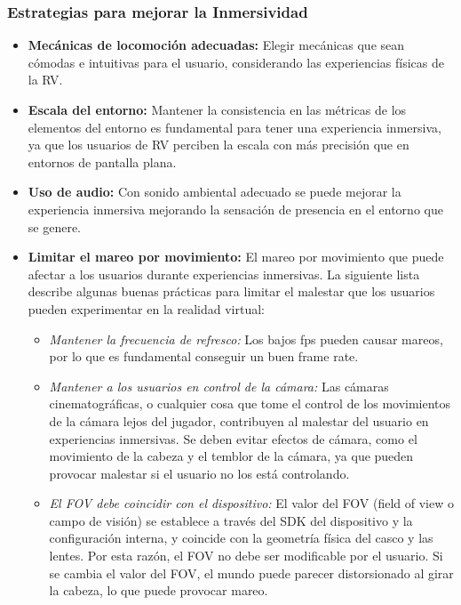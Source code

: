             \subsubsection{Estrategias para mejorar la Inmersividad}
            \begin{itemize}
                \item \textbf{Mecánicas de locomoción adecuadas:}  Elegir mecánicas que sean cómodas e intuitivas para el usuario, considerando las experiencias físicas de la RV. 
                \item \textbf{Escala del entorno:} Mantener la consistencia en las métricas de los elementos del entorno es fundamental para tener una experiencia inmersiva, ya que los usuarios de RV perciben la escala con más precisión que en entornos de pantalla plana.
                \item \textbf{Uso de audio:} Con sonido ambiental adecuado se puede mejorar la experiencia inmersiva mejorando la sensación de presencia en el entorno que se genere.
                \item \textbf{Limitar el mareo por movimiento:} El mareo por movimiento que puede afectar a los usuarios durante experiencias inmersivas. La siguiente lista describe algunas buenas prácticas para limitar el malestar que los usuarios pueden experimentar en la realidad virtual:
                \begin{itemize}
                    \item \textit{Mantener la frecuencia de refresco:} Los bajos fps pueden causar mareos, por lo que es fundamental conseguir un buen frame rate.

                    \item \textit{Mantener a los usuarios en control de la cámara:} Las cámaras cinematográficas, o cualquier cosa que tome el control de los movimientos de la cámara lejos del jugador, contribuyen al malestar del usuario en experiencias inmersivas. Se deben evitar efectos de cámara, como el movimiento de la cabeza y el temblor de la cámara, ya que pueden provocar malestar si el usuario no los está controlando.
                    
                    \item \textit{El FOV debe coincidir con el dispositivo:} El valor del FOV (field of view o campo de visión) se establece a través del SDK del dispositivo y la configuración interna, y coincide con la geometría física del casco y las lentes. Por esta razón, el FOV no debe ser modificable por el usuario. Si se cambia el valor del FOV, el mundo puede parecer distorsionado al girar la cabeza, lo que puede provocar mareo.
                    

\end{itemize}
\end{itemize}
